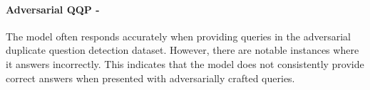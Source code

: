 \paragraph{Adversarial QQP - \moderate}
The model often responds accurately when providing queries in the adversarial duplicate question detection dataset. However, there are notable instances where it answers incorrectly. This indicates that the model does not consistently provide correct answers when presented with adversarially crafted queries. 
